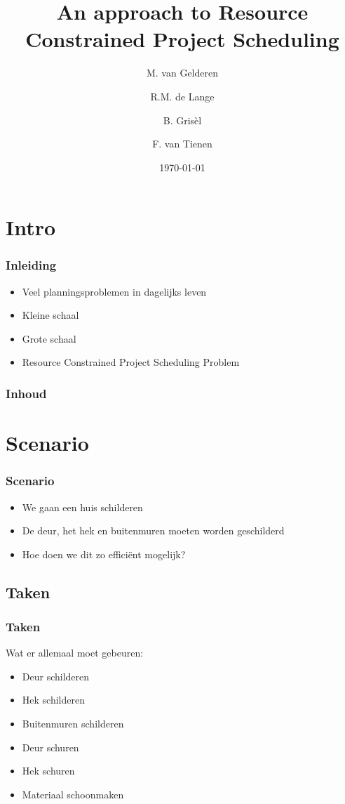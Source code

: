 \documentclass{beamer}
\title[RCPS]{An approach to Resource Constrained Project Scheduling}
\author{M. van Gelderen  \and
    R.M. de Lange \and
    B. Gris\`el \and
    F. van Tienen}
\institute{TU Delft}
\date{\today}
\theoremstyle{definition}
\begin{document}
\begin{frame}
\titlepage
\end{frame}

\section*{Intro}
\begin{frame}
  \frametitle{Inleiding}
  \begin{itemize}
		\item Veel planningsproblemen in dagelijks leven
		\item Kleine schaal
		\item Grote schaal
		\item Resource Constrained Project Scheduling Problem
  \end{itemize}
\end{frame}

\begin{frame}
    \frametitle{Inhoud}
    \tableofcontents
\end{frame}


\section{Scenario}

\begin{frame}
    \frametitle{Scenario}
    \begin{itemize}
    	\item We gaan een huis schilderen
    	\item De deur, het hek en buitenmuren moeten worden geschilderd
    	\item Hoe doen we dit zo effici\"{e}nt mogelijk?
    \end{itemize}
\end{frame}

\subsection{Taken}
\begin{frame}
    \frametitle{Taken}
    Wat er allemaal moet gebeuren:
     \begin{itemize}
    	\item Deur schilderen
	\item Hek schilderen
	\item Buitenmuren schilderen
	\item<2-> Deur schuren
	\item<2-> Hek schuren
	\item<3-> Materiaal schoonmaken
    \end{itemize}
\end{frame}
\end{document}
